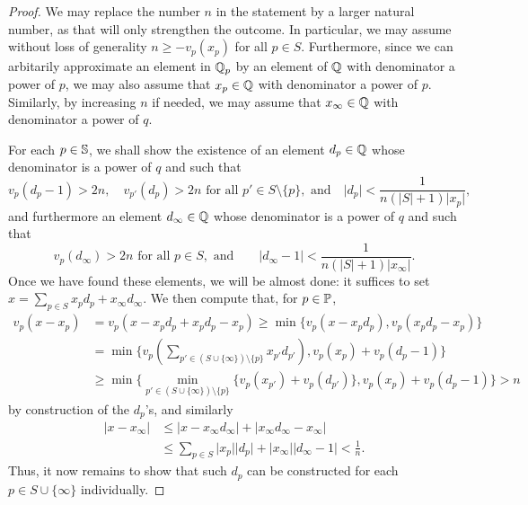 \documentclass[12pt, leqno, british]{amsart}
\begin{document}
\begin{proof}
We may replace the number $n$ in the statement by a larger natural number, as that will only strengthen the outcome.
In particular, we may assume without loss of generality $n \geq -v_p(x_p)$ for all $p \in S$.
Furthermore, since we can arbitarily approximate an element in $\mathbb Q_p$ by an element of $\mathbb Q$ with denominator a power of $p$, we may also assume that $x_p \in \mathbb Q$ with denominator a power of $p$.
Similarly, by increasing $n$ if needed, we may assume that $x_\infty \in \mathbb Q$ with denominator a power of $q$.

For each $p \in \mathbb S$, we shall show the existence of an element $d_p \in \mathbb Q$ whose denominator is a power of $q$ and such that
\begin{displaymath}
v_p(d_p-1) > 2n, \quad v_{p'}(d_p) > 2n \text{ for all } p' \in S \setminus \lbrace p \rbrace, \text{ and}\quad \lvert d_p \rvert < \frac{1}{n(\lvert S \rvert + 1) \lvert x_p \rvert},
\end{displaymath}
and furthermore an element $d_\infty \in \mathbb Q$ whose denominator is a power of $q$ and such that
\begin{displaymath}
v_p(d_\infty) > 2n \text{ for all } p \in S, \text{ and}\qquad \lvert d_\infty - 1 \rvert < \frac{1}{n(\lvert S \rvert + 1)\lvert x_\infty \rvert}.
\end{displaymath}
Once we have found these elements, we will be almost done: it suffices to set $x = \sum_{p \in S} x_pd_p + x_\infty d_\infty$.
We then compute that, for $p \in \mathbb P$,
\begin{align*}
v_p(x - x_p) &= v_p(x - x_pd_p + x_pd_p - x_p) \geq \min \lbrace v_p(x - x_pd_p), v_p(x_pd_p - x_p) \rbrace \\
&= \min \lbrace v_p(\sum_{p' \in (S \cup \lbrace \infty \rbrace) \setminus \lbrace p \rbrace} x_{p'}d_{p'}), v_p(x_p) + v_p(d_p - 1) \rbrace \\
&\geq \min \lbrace \min_{p' \in (S \cup \lbrace \infty \rbrace) \setminus \lbrace p \rbrace} \lbrace v_p(x_{p'}) + v_p(d_{p'}) \rbrace, v_p(x_p) + v_p(d_p - 1) \rbrace > n
\end{align*}
by construction of the $d_p$'s, and similarly
\begin{align*}
\lvert x - x_\infty \rvert &\leq \lvert x - x_\infty d_\infty \rvert + \lvert x_\infty d_\infty - x_\infty \rvert \\
&\leq \sum_{p \in S} \lvert x_p \rvert \lvert d_p \rvert + \lvert x_\infty \rvert \lvert d_\infty - 1 \rvert < \frac{1}{n}.
\end{align*}
Thus, it now remains to show that such $d_p$ can be constructed for each $p \in S \cup \lbrace \infty \rbrace$ individually.


\end{proof}
\end{document}
